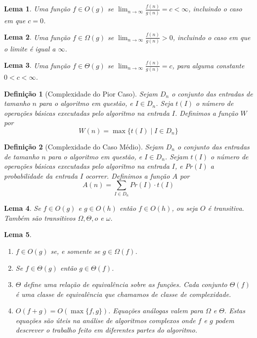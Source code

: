 \documentclass[12pt]{book}
\newtheorem{definicao}{Definição}
\newtheorem{lema}{Lema}
\begin{document}
\begin{lema}
  Uma função $f \in O(g)$ se $\displaystyle\lim_{n \to \infty}\frac{f(n)}{g(n)} = c < \infty$, incluindo o caso em que $c=0$.
\end{lema}

\begin{lema}
  Uma função $f \in \Omega(g)$ se $\displaystyle\lim_{n \to \infty}\frac{f(n)}{g(n)} > 0$, incluindo o caso em que o limite é igual a $\infty$.
\end{lema}

\begin{lema}
  Uma função $f \in \Theta(g)$ se $\displaystyle\lim_{n \to \infty}\frac{f(n)}{g(n)} = c$, para alguma constante $0< c < \infty$.
\end{lema}

\begin{definicao}[Complexidade do Pior Caso] Sejam $D_n$ o conjunto das entradas de tamanho $n$ para o algoritmo em questão, e $I\in D_n$. Seja $t(I)$ o número de operações básicas executadas pelo algoritmo na entrada $I$. Definimos a função $W$ por
$$W(n) = \max\{ t(I) \mid I \in D_n\}$$
\end{definicao}

\begin{definicao}[Complexidade do Caso Médio] Sejam $D_n$ o conjunto das entradas de tamanho $n$ para o algoritmo em questão, e $I\in D_n$. Sejam $t(I)$ o número de operações básicas executadas pelo algoritmo na entrada $I$, e $Pr(I)$ a probabilidade da entrada $I$ ocorrer. Definimos a função $A$ por
$$A(n) = \displaystyle\sum_{I\in D_n} Pr(I)\cdot t(I)$$
\end{definicao}

\begin{lema}
  Se $f \in O(g)$ e $g \in O(h)$ então $f \in O(h)$, ou seja $O$ é transitiva. Também são transitivos $\Omega, \Theta, o$ e $\omega$.
\end{lema}

\begin{lema}~ 
  \begin{enumerate} 
\item $f \in O(g)$ se, e somente se $g \in \Omega(f)$.
\item Se $f \in \Theta(g)$ então $g \in \Theta(f)$.
\item $\Theta$ define uma relação de equivalência sobre as funções. Cada conjunto $\Theta(f)$ é uma classe de equivalência que chamamos de \emph{classe de complexidade}.
\item $O(f+g) = O(\max\{f,g\})$. Equações análogas valem para $\Omega$ e $\Theta$. Estas equações são úteis na análise de algoritmos complexos onde $f$ e $g$ podem descrever o trabalho feito em diferentes partes do algoritmo.
\end{enumerate}
\end{lema}
\end{document}
